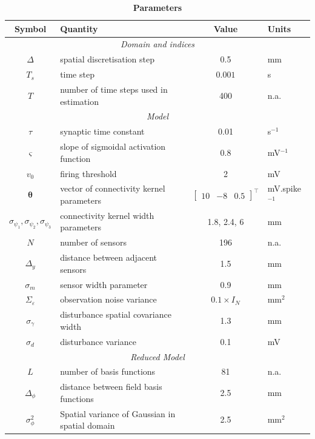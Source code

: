 \documentclass[12pt]{iopart}
\begin{document}
\begin{table}[!ht]
\caption{
\bf{Parameters}}
\begin{tabular}{|c|l|c|l|}
	\hline
	\textbf{Symbol} & \textbf{Quantity} & \textbf{Value} & \textbf{Units}\\
	\hline
	\multicolumn{4}{|c|}{\emph{Domain and indices}}\\
	\hline
	$\Delta$ & spatial discretisation step & 0.5 & mm \\
	$T_s$ & time step & $0.001$ & s\\
	$T$ & number of time steps used in estimation & 400 & n.a.\\
	\hline 
\multicolumn{4}{|c|}{\emph{Model}}\\
	\hline
	$\tau$ & synaptic time constant & 0.01 & s$^{-1}$ \\
	$\varsigma$ & slope of sigmoidal activation function & 0.8 & mV$^{-1}$\\
	$v_0$ & firing threshold & 2 & mV \\
	$\boldsymbol{\theta}$ & vector of connectivity kernel parameters & $\left[\begin{array}{ccc}
	10 &-8 &0.5
	\end{array}
	\right]^{\top}$ & mV.spike$^{-1}$\\
	$\sigma_{\psi_{1}}, \sigma_{\psi_{2}}, \sigma_{\psi_{3}}$ & connectivity kernel width parameters & 1.8, 2.4, 6 & mm\\
	$N$ & number of sensors & 196 & n.a.\\ 
	$\Delta_y$ & distance between adjacent sensors & 1.5 & mm\\
	$\sigma_{m}$ & sensor width parameter & 0.9 & mm \\
	$\Sigma_{\varepsilon}$ & observation noise variance & $0.1 \times I_{N}$ & mm$^2$ \\
	$\sigma_{\gamma}$& disturbance spatial covariance width & 1.3 & mm\\
	$\sigma_{d}$ & disturbance variance & 0.1 & mV \\
	\hline 
	\multicolumn{4}{|c|}{\emph{Reduced Model}}\\
	\hline
	$L$ & number of basis functions& 81 & n.a.\\
	$\Delta_{\phi}$ & distance between field basis functions & 2.5 & mm \\
	$\sigma^2_{\phi}$ & Spatial variance of Gaussian in spatial domain & 2.5 & mm$^2$\\
	\hline 

\end{tabular}
\end{table}
\end{document}
